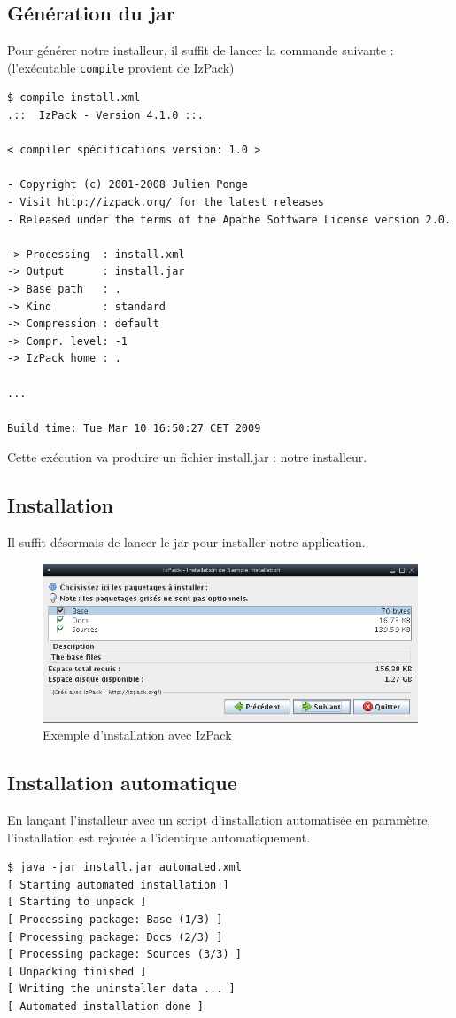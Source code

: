 \subsection{Génération du jar}
Pour générer notre installeur, il suffit de lancer la commande suivante : (l'exécutable \verb|compile| provient de IzPack)
\begin{verbatim}
$ compile install.xml
.::  IzPack - Version 4.1.0 ::.

< compiler spécifications version: 1.0 >

- Copyright (c) 2001-2008 Julien Ponge
- Visit http://izpack.org/ for the latest releases
- Released under the terms of the Apache Software License version 2.0.

-> Processing  : install.xml
-> Output      : install.jar
-> Base path   : .
-> Kind        : standard
-> Compression : default
-> Compr. level: -1
-> IzPack home : .

...

Build time: Tue Mar 10 16:50:27 CET 2009
\end{verbatim}
Cette exécution va produire un fichier install.jar : notre installeur.
\subsection{Installation}
Il suffit désormais de lancer le jar pour installer notre application.
\begin{figure}[H]
	\centering
	\includegraphics[width=15cm]{../image/installSample.png}
	\caption{Exemple d'installation avec IzPack}
\end{figure}
\subsection{Installation automatique}
En lançant l'installeur avec un script d'installation automatisée en paramètre, l'installation est rejouée a l'identique automatiquement.
\begin{verbatim}
$ java -jar install.jar automated.xml
[ Starting automated installation ]
[ Starting to unpack ]
[ Processing package: Base (1/3) ]
[ Processing package: Docs (2/3) ]
[ Processing package: Sources (3/3) ]
[ Unpacking finished ]
[ Writing the uninstaller data ... ]
[ Automated installation done ]
\end{verbatim}

